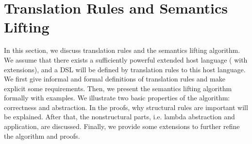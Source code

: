 \section{Translation Rules and Semantics Lifting}\label{sec:tr}

In this section, we discuss translation rules and the semantics lifting algorithm.
We assume that there exists a sufficiently powerful extended host language (\STLC{} with extensions), and a DSL will be defined by translation rules to this host language.
We first give informal and formal definitions of translation rules and make explicit some requirements.
Then, we present the semantics lifting algorithm formally with examples.
We illustrate two basic properties of the algorithm: correctness and abstraction.
In the proofs, why structural rules are important will be explained.
After that, the nonstructural parts, i.e. lambda abstraction and application, are discussed.
Finally, we provide some extensions to further refine the algorithm and proofs.






